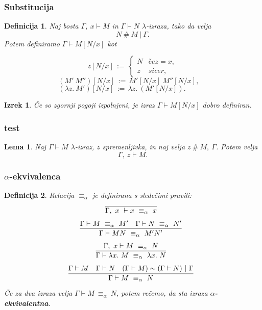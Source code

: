 \documentclass{beamer}
\newcommand{\inference}[3][]{\infer[#1]{#3}{#2}}
\newtheorem{izrek}{Izrek}
\newtheorem{lema}{Lema}
\newtheorem{definicija}{Definicija}
\begin{document}
\begin{frame}[fragile]
\frametitle{Substitucija}


\begin{definicija}
    Naj bosta \(\Gamma,\ x \vdash M\) in \(\Gamma \vdash N\) \(\lambda\)-izraza, tako da velja \[N \ \#\ M \ \vert\ \Gamma.\] Potem definiramo \(\Gamma \vdash M[N/x]\) kot
    
    \[z[N/x]\, :=\, \begin{cases*}
    N & če z = x,\\
    z & sicer,
    \end{cases*}
    \]
    \[
        (M'\ M'')[N/x]\, :=\, M'[N/x]\ M''[N/x],\ \ \ \ \ 
    \]
    \[
        (\lambda z.\ M')[N/x]\, :=\, \lambda z.\ (M'[N/x]).\quad \quad \quad
    \]
    
    
\end{definicija}
\pause
\begin{izrek}
    Če so zgornji pogoji izpolnjeni, je izraz \(\Gamma \vdash M[N/x]\) dobro definiran.
\end{izrek}
\end{frame}


\begin{frame}[fragile]
\frametitle{test}

\begin{lema}
    Naj \(\Gamma \vdash M\) \(\lambda\)-izraz, \(z\) spremenljivka, in naj velja \(z \ \#\  M,\ \Gamma\). Potem velja \[
        \Gamma,\ z \vdash M.
    \]
\end{lema}

\end{frame}


\begin{frame}[fragile]
\frametitle{\(\alpha\)-ekvivalenca}


\begin{definicija}
    Relacija \(\equiv_\alpha\) je definirana s sledečimi pravili:
    \[
        \inference[]{}{\Gamma,\ x\ \vdash x \ \equiv_\alpha\ x}
    \]
    \[
        \inference{\Gamma \vdash M\ \equiv_\alpha\ M' \quad \Gamma \vdash N\ \equiv_\alpha\ N'}{\Gamma \vdash MN\ \equiv_\alpha\ M'N'}
    \]
    \[
        \inference{\Gamma,\ x \vdash M\ \equiv_\alpha\ N}{\Gamma \vdash \lambda x.\ M\ \equiv_\alpha\ \lambda x.\ N}
    \]
    \[
        \inference{\Gamma \vdash M \quad \Gamma \vdash N \quad (\Gamma \vdash M) \sim (\Gamma \vdash N) \ \vert\ \Gamma}{\Gamma \vdash M\ \equiv_\alpha\ N}
    \]
    Če za dva izraza velja \(\Gamma \vdash M\ \equiv_\alpha\ N\), potem rečemo, da sta izraza \textbf{\(\alpha\)-ekvivalentna}.
\end{definicija}

\end{frame}
\end{document}
